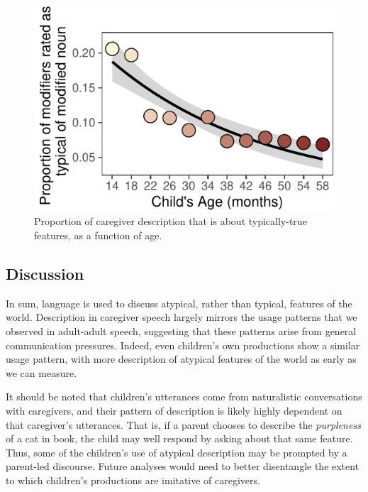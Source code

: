 \documentclass[10pt, letterpaper]{article}
\newenvironment{CodeChunk}{}{}
\begin{document}
\begin{CodeChunk}
\begin{figure}[tb]

{\centering \includegraphics{figs/prototypical_plot-1} 

}

\caption[Proportion of caregiver description that is about typically-true features, as a function of age]{Proportion of caregiver description that is about typically-true features, as a function of age.}\label{fig:prototypical_plot}
\end{figure}
\end{CodeChunk}

\hypertarget{discussion}{%
\subsection{Discussion}\label{discussion}}

In sum, language is used to discuss atypical, rather than typical,
features of the world. Description in caregiver speech largely mirrors
the usage patterns that we observed in adult-adult speech, suggesting
that these patterns arise from general communication pressures. Indeed,
even children's own productions show a similar usage pattern, with more
description of atypical features of the world as early as we can
measure.

It should be noted that children's utterances come from naturalistic
conversations with caregivers, and their pattern of description is
likely highly dependent on that caregiver's utterances. That is, if a
parent chooses to describe the \emph{purpleness} of a cat in book, the
child may well respond by asking about that same feature. Thus, some of
the children's use of atypical description may be prompted by a
parent-led discourse. Future analyses would need to better disentangle
the extent to which children's productions are imitative of caregivers.
\end{document}
